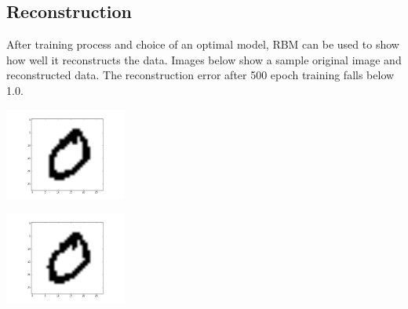 \documentclass[a4paper]{scrartcl}
\begin{document}
\subsection{Reconstruction}
After training process and choice of an optimal model, RBM can be used to show how well it reconstructs the data. Images below show a sample original image and reconstructed data. The reconstruction error after 500 epoch training falls below 1.0.
\begin{minipage}[t]{0.5\textwidth}
\begin{center}
\includegraphics[width=4cm]{images/0original.png}
\end{center}
\end{minipage}
\begin{minipage}[t]{0.5\textwidth}
\begin{center}
\includegraphics[width=4cm]{images/0_reconstructed_momentum00.png}
\end{center}
\end{minipage}
\end{document}
